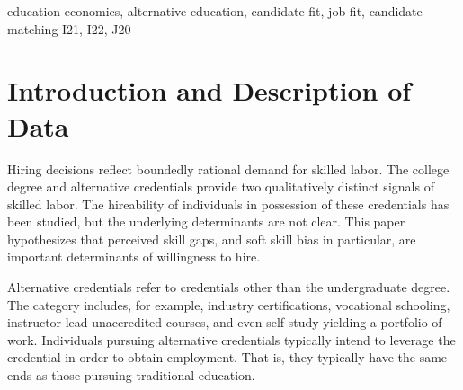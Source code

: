 \documentclass[review]{elsarticle}
\begin{document}
\begin{frontmatter}
\begin{abstract}
    \end{abstract}

    \begin{keyword}
        education economics, alternative education, candidate fit, job fit, candidate matching     %
        \MSC[2010] I21, I22, J20                                                                   %
    \end{keyword}

\end{frontmatter}

\pagebreak
\linenumbers

\section{Introduction and Description of Data}

Hiring decisions reflect boundedly rational demand for skilled labor.
The college degree and alternative credentials provide two qualitatively distinct signals of skilled labor.
The hireability of individuals in possession of these credentials has been studied,
but the underlying determinants are not clear.
This paper hypothesizes that perceived skill gaps,
and soft skill bias in particular,
are important determinants of willingness to hire.

Alternative credentials refer to credentials other than the undergraduate degree\cite{brown2017complex}.
The category includes, for example,
industry certifications, vocational schooling, instructor-lead unaccredited courses,
and even self-study yielding a portfolio of work.
Individuals pursuing alternative credentials typically intend to leverage the credential in order to obtain employment.
That is, they typically have the same ends as those pursuing traditional education.
\end{document}

